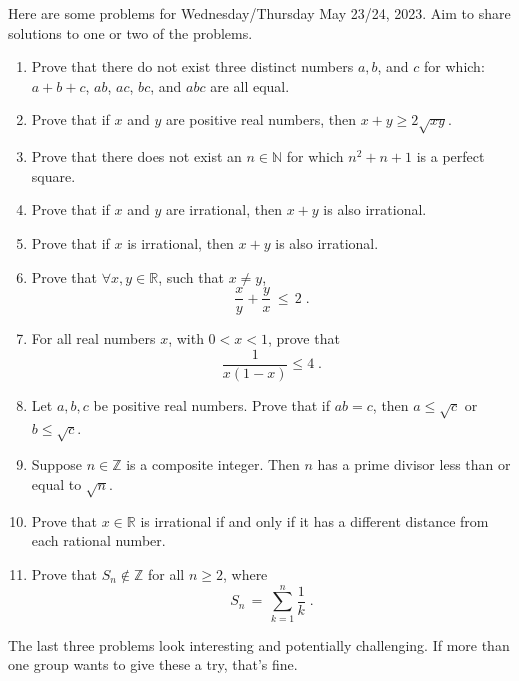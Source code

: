 \documentclass[12pt]{article} %
\begin{document}
\noindent Here are some problems for Wednesday/Thursday May 23/24,
2023. Aim to share solutions to one or two of the problems. 
\bigskip

\begin{enumerate}
\setlength{\itemsep}{4mm} %

\item Prove that there do not exist three distinct numbers $a,b$, and
  $c$ for which:
  $a+b+c$, $ab$, $ac$, $bc$, and $abc$ are all equal.

  \item Prove that if $x$ and $y$ are positive real numbers, then
    $x+y \geq 2 \sqrt{xy}$.   

\item Prove that there does not exist an $n \in \mathbb{N}$ for which
  $n^2 + n + 1$ is a perfect square.

\item Prove that if $x$ and $y$ are irrational, then $x+y$ is also
  irrational.

\item Prove that if $x$ is irrational, then $x+y$ is also
  irrational.

\item Prove that $\forall x, y \in \mathbb{R}$, such that $x \neq
  y$,
  \begin{equation}
    \frac{x}{y} + \frac{y}{x} \, \leq \, 2 \;.
  \end{equation}


\item For all real numbers $x$, with $0<x<1$, prove that
  \begin{equation}
    \frac{1}{x(1-x)} \leq 4 \;.
  \end{equation}

  \item Let $a,b,c$ be positive real numbers. Prove that if $ab = c$,
    then $a \leq \sqrt{c}$ or $b \leq \sqrt{c}$. 

\item Suppose $n \in \mathbb{Z}$ is a composite integer. Then $n$ has
  a prime divisor less than or equal to $\sqrt{n}$. 
    
\item Prove that $x \in \mathbb{R}$ is irrational if and only if it
  has a different distance from each rational number.

\item Prove that $S_n \notin \mathbb{Z}$ for all $n\geq 2$, where
  \begin{equation}
    S_n \, = \, \sum_{k=1}^n \frac{1}{k} \;.
  \end{equation}
 

\end{enumerate}


The last three problems look interesting and potentially
challenging. If more than one group wants to give these a try, that's
fine. 
\end{document}
